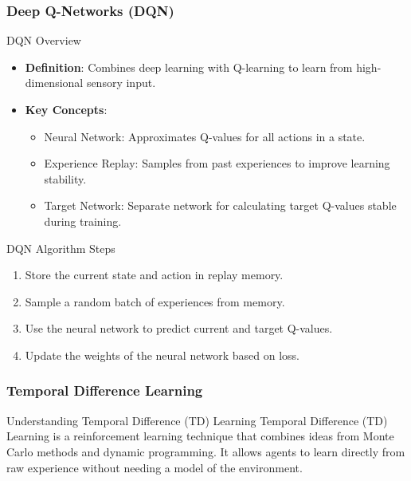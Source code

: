 \documentclass[aspectratio=169]{beamer}
\begin{document}
\begin{frame}[fragile]
    \frametitle{Deep Q-Networks (DQN)}
    \begin{block}{DQN Overview}
        \begin{itemize}
            \item \textbf{Definition}: Combines deep learning with Q-learning to learn from high-dimensional sensory input.
            \item \textbf{Key Concepts}:
                \begin{itemize}
                    \item Neural Network: Approximates Q-values for all actions in a state.
                    \item Experience Replay: Samples from past experiences to improve learning stability.
                    \item Target Network: Separate network for calculating target Q-values stable during training.
                \end{itemize}
        \end{itemize}
    \end{block}
    
    \begin{block}{DQN Algorithm Steps}
        \begin{enumerate}
            \item Store the current state and action in replay memory.
            \item Sample a random batch of experiences from memory.
            \item Use the neural network to predict current and target Q-values.
            \item Update the weights of the neural network based on loss.
        \end{enumerate}
    \end{block}
\end{frame}

\begin{frame}[fragile]
  \frametitle{Temporal Difference Learning}
  \begin{block}{Understanding Temporal Difference (TD) Learning}
    Temporal Difference (TD) Learning is a reinforcement learning technique that combines ideas from Monte Carlo methods and dynamic programming. It allows agents to learn directly from raw experience without needing a model of the environment.
  \end{block}
\end{frame}
\end{document}
